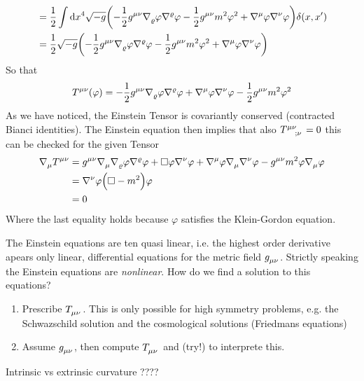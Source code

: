 \begin{example}
\begin{equation}
\begin{split}
&=\frac{1}{2}\int \dif x^4
\sqrt{-g}\left(-\frac{1}{2}\tensor{g}{^\mu^\nu}\tensor{\nabla}{_\varrho}\varphi\tensor{\nabla}{^\varrho}\varphi-\frac{1}{2}\tensor{g}{^\mu^\nu}m^2\varphi^2
+\tensor{\nabla}{^\mu}\varphi\tensor{\nabla}{^\nu}\varphi\right)\delta(x,x')\\
&=\frac{1}{2}\sqrt{-g}\left(-\frac{1}{2}\tensor{g}{^\mu^\nu}\tensor{\nabla}{_\varrho}\varphi\tensor{\nabla}{^\varrho}\varphi-\frac{1}{2}\tensor{g}{^\mu^\nu}m^2\varphi^2
+\tensor{\nabla}{^\mu}\varphi\tensor{\nabla}{^\nu}\varphi\right)
\end{split}
\end{equation}
So that
\begin{equation}
\tensor{T}{^\mu^\nu}(\varphi)
=-\frac{1}{2}\tensor{g}{^\mu^\nu}\tensor{\nabla}{_\varrho}\varphi\tensor{\nabla}{^\varrho}\varphi
+\tensor{\nabla}{^\mu}\varphi\tensor{\nabla}{^\nu}\varphi
-\frac{1}{2}\tensor{g}{^\mu^\nu}m^2\varphi^2
\end{equation}
As we have noticed, the Einstein Tensor is covariantly conserved (contracted
Bianci identities). The Einstein equation then implies that also
$\tensor{T}{^\mu^\nu_{;\nu}}=0$ this can be checked for the given Tensor
\begin{equation}
\begin{split}
\tensor{\nabla}{_\mu}\tensor{T}{^\mu^\nu}
&=\tensor{g}{^\mu^\nu}\tensor{\nabla}{_\mu}\tensor{\nabla}{_\varrho}\varphi\tensor{\nabla}{^\varrho}\varphi+\square\varphi\tensor{\nabla}{^\nu}\varphi+\tensor{\nabla}{^\mu}\varphi\tensor{\nabla}{_\mu}\tensor{\nabla}{^\nu}\varphi
-\tensor{g}{^\mu^\nu}m^2\varphi\tensor{\nabla}{_\mu}\varphi\\
&=\tensor{\nabla}{^\nu}\varphi\left(\square-m^2\right)\varphi\\
&=0
\end{split}
\end{equation}
Where the last equality holds because $\varphi$ satisfies the Klein-Gordon
equation. 
\end{example}
The Einstein equations are ten quasi linear, i.e. the highest order
derivative apears only linear, differential equations for the metric field
$\tensor{g}{_\mu_\nu}$. Strictly speaking the Einstein equations are
\emph{nonlinear}.
How do we find a solution to this equations?
\begin{enumerate}
  \item Prescribe $\tensor{T}{_\mu_\nu}$. This is only possible for high
  symmetry problems, e.g. the Schwazschild solution and the cosmological
  solutions (Friedmans equations)
  \item Assume $\tensor{g}{_\mu_\nu}$, then compute $\tensor{T}{_\mu_\nu}$ and
  (try!) to interprete this.
\end{enumerate}
Intrinsic vs extrinsic curvature ????
